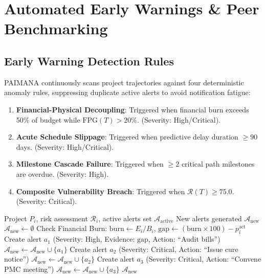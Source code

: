 \documentclass[conference]{IEEEtran}
\begin{document}
\section{Automated Early Warnings \& Peer Benchmarking}

\subsection{Early Warning Detection Rules}
PAIMANA continuously scans project trajectories against four deterministic anomaly rules, suppressing duplicate active alerts to avoid notification fatigue:
\begin{enumerate}
    \item \textbf{Financial-Physical Decoupling}: Triggered when financial burn exceeds 50\% of budget while $\text{FPG}(T) > 20\%$. (Severity: High/Critical).
    \item \textbf{Acute Schedule Slippage}: Triggered when predictive delay duration $\ge 90$ days. (Severity: High/Critical).
    \item \textbf{Milestone Cascade Failure}: Triggered when $\ge 2$ critical path milestones are overdue. (Severity: High).
    \item \textbf{Composite Vulnerability Breach}: Triggered when $\mathcal{R}(T) \ge 75.0$. (Severity: Critical).
\end{enumerate}

\begin{algorithm}[htbp]
\caption{Dynamic Anomaly Alert Generation \& Suppression}
\label{alg_alerts}
\begin{algorithmic}[1]
\REQUIRE Project $P_i$, risk assessment $\mathcal{R}_i$, active alerts set $\mathcal{A}_{\text{active}}$
\ENSURE New alerts generated $\mathcal{A}_{\text{new}}$
\STATE $\mathcal{A}_{\text{new}} \leftarrow \emptyset$
\STATE Check Financial Burn: $\text{burn} \leftarrow E_i / B_i$, $\text{gap} \leftarrow (\text{burn} \times 100) - p_i^{\text{act}}$
        \STATE Create alert $a_1$ (Severity: High, Evidence: $\text{gap}$, Action: ``Audit bills'')
        \STATE $\mathcal{A}_{\text{new}} \leftarrow \mathcal{A}_{\text{new}} \cup \{ a_1 \}$
    \ENDIF
\ENDIF
{}
        \STATE Create alert $a_2$ (Severity: Critical, Action: ``Issue cure notice'')
        \STATE $\mathcal{A}_{\text{new}} \leftarrow \mathcal{A}_{\text{new}} \cup \{ a_2 \}$
    \ENDIF
\ENDIF
{}
        \STATE Create alert $a_3$ (Severity: Critical, Action: ``Convene PMC meeting'')
        \STATE $\mathcal{A}_{\text{new}} \leftarrow \mathcal{A}_{\text{new}} \cup \{ a_3 \}$
    \ENDIF
\ENDIF
\RETURN $\mathcal{A}_{\text{new}}$
\end{algorithmic}
\end{algorithm}
\end{document}

